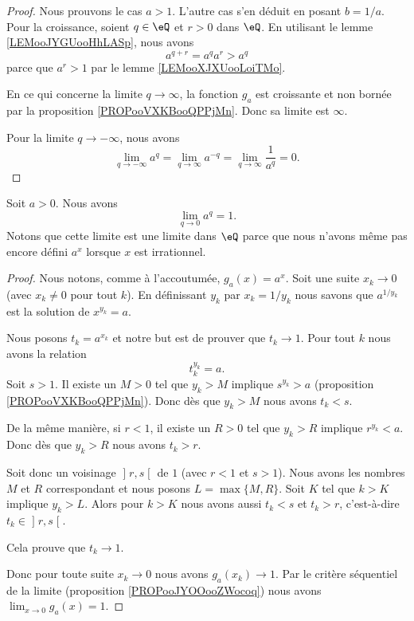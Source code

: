 \begin{proof}
    Nous prouvons le cas \( a>1\). L'autre cas s'en déduit en posant \( b=1/a\). Pour la croissance, soient \( q\in \eQ\) et \( r>0\) dans \( \eQ\). En utilisant le lemme \ref{LEMooJYGUooHhLASp}, nous avons
    \begin{equation}
        a^{q+r}=a^qa^r>a^q
    \end{equation}
    parce que \( a^r>1\) par le lemme \ref{LEMooXJXUooLoiTMo}. 

    En ce qui concerne la limite \( q\to \infty\), la fonction \( g_a\) est croissante et non bornée par la proposition \ref{PROPooVXKBooQPPjMn}. Donc sa limite est \( \infty\).

    Pour la limite \( q\to -\infty\), nous avons
    \begin{equation}
        \lim_{q\to -\infty} a^q=\lim_{q\to \infty} a^{-q}=\lim_{q\to \infty} \frac{1}{ a^q }=0.
    \end{equation}
\end{proof}

\begin{proposition}      \label{PROPooIIDGooTRtlUD}
    Soit \( a>0\). Nous avons
    \begin{equation}
        \lim_{q\to 0} a^q=1.
    \end{equation}
    Notons que cette limite est une limite dans \( \eQ\) parce que nous n'avons même pas encore défini \( a^x\) lorsque \( x\) est irrationnel.
\end{proposition}

\begin{proof}
    Nous notons, comme à l'accoutumée, \( g_a(x)=a^x\). Soit une suite \( x_k\to 0\) (avec \( x_k\neq 0\) pour tout \( k\)). En définissant \( y_k\) par \( x_k=1/y_k\) nous savons que \( a^{1/y_k}\) est la solution de \( x^{y_k}=a\).

    Nous posons \( t_k=a^{x_k}\) et notre but est de prouver que \( t_k\to 1\). Pour tout \( k\) nous avons la relation
    \begin{equation}
        t_k^{y_k}=a.
    \end{equation}
    Soit \( s>1\). Il existe un \( M>0\) tel que \( y_k>M\) implique \( s^{y_k}>a\) (proposition \ref{PROPooVXKBooQPPjMn}). Donc dès que \( y_k>M\) nous avons \( t_k<s\).

    De la même manière, si \( r<1\), il existe un \( R>0\) tel que \( y_k>R\) implique \( r^{y_k}<a\). Donc dès que \( y_k>R\) nous avons \( t_k>r\).

    Soit donc un voisinage \( \mathopen] r , s \mathclose[\) de \( 1\) (avec \( r<1\) et \( s>1\)). Nous avons les nombres \( M\) et \( R\) correspondant et nous posons \( L=\max\{ M,R \}\). Soit \( K\) tel que \( k>K\) implique \( y_k>L\). Alors pour \( k>K\) nous avons aussi \( t_k<s\) et \( t_k>r\), c'est-à-dire \( t_k\in \mathopen] r , s \mathclose[\).

        Cela prouve que \( t_k\to 1\).

        Donc pour toute suite \( x_k\to 0\) nous avons \( g_a(x_k)\to 1\). Par le critère séquentiel de la limite (proposition \ref{PROPooJYOOooZWocoq}) nous avons \( \lim_{x\to 0} g_a(x)=1\).
\end{proof}

